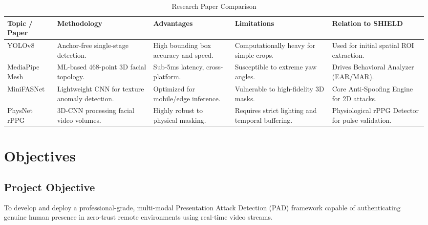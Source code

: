 \begin{table}[H]
\centering
\caption{Research Paper Comparison}
\begin{tabularx}{\textwidth}{|X|X|X|X|X|}
\hline
\textbf{Topic / Paper} & \textbf{Methodology} & \textbf{Advantages} & \textbf{Limitations} & \textbf{Relation to SHIELD} \\
\hline
YOLOv8 \cite{jocher2023yolo} & Anchor-free single-stage detection. & High bounding box accuracy and speed. & Computationally heavy for simple crops. & Used for initial spatial ROI extraction. \\
\hline
MediaPipe Mesh \cite{lugaresi2019mediapipe} & ML-based 468-point 3D facial topology. & Sub-5ms latency, cross-platform. & Susceptible to extreme yaw angles. & Drives Behavioral Analyzer (EAR/MAR). \\
\hline
MiniFASNet & Lightweight CNN for texture anomaly detection. & Optimized for mobile/edge inference. & Vulnerable to high-fidelity 3D masks. & Core Anti-Spoofing Engine for 2D attacks. \\
\hline
PhysNet rPPG \cite{yu2019remote} & 3D-CNN processing facial video volumes. & Highly robust to physical masking. & Requires strict lighting and temporal buffering. & Physiological rPPG Detector for pulse validation. \\
\hline
\end{tabularx}
\end{table}

\chapter{Objectives}

\section{Project Objective}
To develop and deploy a professional-grade, multi-modal Presentation Attack Detection (PAD) framework capable of authenticating genuine human presence in zero-trust remote environments using real-time video streams.

